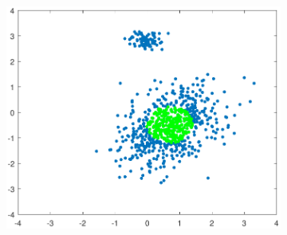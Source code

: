 \documentclass[preprint,12pt]{elsarticle}
\begin{document}
\begin{figure}[!htb]
	\begin{subfigure}[b]{0.40\linewidth}
		\centering\includegraphics[width=1\linewidth]{figures/kcstep/c2input.pdf}
		\caption{\label{fig:spatialmedc2}}
	\end{subfigure} \\


\end{figure}
\end{document}
